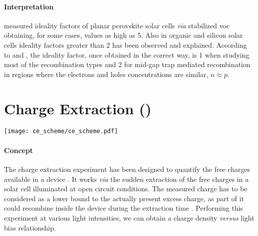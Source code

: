 		\paragraph{Interpretation} %
		 measured ideality factors of planar perovskite solar cells \textsl{via} stabilized \gls{voc} obtaining, for some cases, values as high as 5.
		Also in organic \cite{Kirchartz2011,Kirchartz2012} and silicon solar cells \cite{Breitenstein2006} ideality factors greater than 2 has been observed and explained.
		According to  and , the ideality factor, once obtained in the correct way, is 1 when studying most of the recombination types and 2 for mid-gap trap mediated recombination in regions where the electrons and holes concentrations are similar, $n \approx p$.

		\FloatBarrier
		\newpage
\section{Charge Extraction ()}\label{characterization_ce}

	\begin{SCfigure}
		\centering
		\texttt{[image: ce\_scheme/ce\_scheme.pdf]}
		\label{fig:ce_scheme}
	\end{SCfigure}


	\paragraph{Concept}
	The charge extraction experiment has been designed to quantify the free charges available in a device \cite{Duffy2000,Barnes2011}.
	It works \textsl{via} the sudden extraction of the free charges in a solar cell illuminated at open circuit conditions.
	The measured charge has to be considered as a lower bound to the actually present excess charge, as part of it could recombine inside the device during the extraction time \cite{ORegan2005}.
	Performing this experiment at various light intensities, we can obtain a charge density \textsl{versus} light bias relationship.

